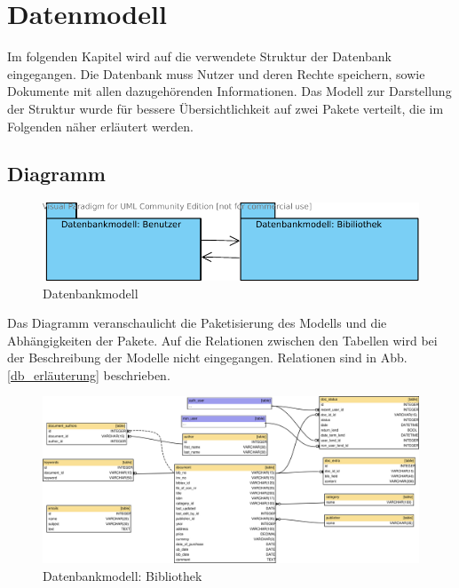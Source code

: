 \chapter{Datenmodell}
\label{kap4}
Im folgenden Kapitel wird auf die verwendete Struktur der Datenbank
eingegangen. Die Datenbank muss Nutzer und deren Rechte speichern, sowie
Dokumente mit allen dazugehörenden Informationen. Das Modell zur Darstellung
der Struktur wurde für bessere Übersichtlichkeit auf zwei Pakete verteilt, die
im Folgenden näher erläutert werden.

\section{Diagramm}


\begin{figure}[H]
\includegraphics[width=1.0\linewidth]{bilder/db_wirelib-packages.pdf}
\caption{Datenbankmodell}
\label{fig:DBDiagramm}
\end{figure}

Das Diagramm veranschaulicht die Paketisierung des Modells und die
Abhängigkeiten der Pakete. Auf die Relationen zwischen den Tabellen wird bei
der Beschreibung der Modelle nicht eingegangen. Relationen sind in Abb.
\ref{db_erläuterung} beschrieben.

\begin{figure}[H]
\includegraphics[width=1.0\linewidth]{bilder/database-wirelib_cluster-doc.pdf}
\caption{Datenbankmodell: Bibliothek}
\label{fig:DB_docDiagramm}
\end{figure}

